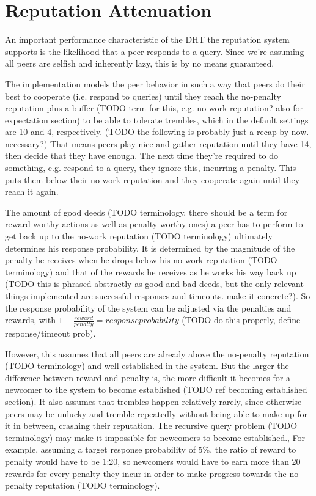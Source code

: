 \section{Reputation Attenuation}
An important performance characteristic of the \ac{DHT} the reputation system
supports is the likelihood that a peer responds to a query. Since we're assuming
all peers are selfish and inherently lazy, this is by no means guaranteed.

The implementation models the peer behavior in such a way that peers do their
best to cooperate (i.e. respond to queries) until they reach the no-penalty
reputation plus a buffer (TODO term for this, e.g. no-work reputation? also for
expectation section) to be able to tolerate trembles, which in the default
settings are 10 and 4, respectively. (TODO the following is probably just a
recap by now. necessary?) That means peers play nice and gather reputation until
they have 14, then decide that they have enough. The next time they're required
to do something, e.g. respond to a query, they ignore this, incurring a penalty.
This puts them below their no-work reputation and they cooperate again until
they reach it again.

The amount of good deeds (TODO terminology, there should be a term for
reward-worthy actions as well as penalty-worthy ones) a peer has to perform to
get back up to the no-work reputation (TODO terminology) ultimately determines
his response probability. It is determined by the magnitude of the penalty he
receives when he drops below his no-work reputation (TODO terminology) and that
of the rewards he receives as he works his way back up (TODO this is phrased
abstractly as good and bad deeds, but the only relevant things implemented are
successful responses and timeouts. make it concrete?). So the response
probability of the system can be adjusted via the penalties and rewards, with $1
- \frac{reward}{penalty} = response probability$ (TODO do this properly, define
response/timeout prob).

However, this assumes that all peers are already above the no-penalty reputation
(TODO terminology) and well-established in the system. But the larger the
difference between reward and penalty is, the more difficult it becomes for a
newcomer to the system to become established (TODO ref becoming established
section). It also assumes that trembles happen relatively rarely, since
otherwise peers may be unlucky and tremble repeatedly without being able to make
up for it in between, crashing their reputation. The recursive query problem
(TODO terminology) may make it impossible for newcomers to become established.,
For example, assuming a target response probability of 5\%, the ratio of reward
to penalty would have to be 1:20, so newcomers would have to earn more than 20
rewards for every penalty they incur in order to make progress towards the
no-penalty reputation (TODO terminology).

